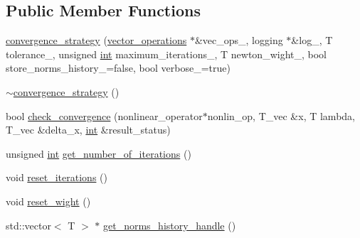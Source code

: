 \subsection*{Public Member Functions}
\begin{DoxyCompactItemize}
\item 
\hyperlink{classnonlinear__operators_1_1newton__method_1_1convergence__strategy_a00e18a10009c673718f85720cfd37f53}{convergence\-\_\-strategy} (\hyperlink{container__test_8cpp_aca3cc0310428d338f3a165c7823d6499}{vector\-\_\-operations} $\ast$\&vec\-\_\-ops\-\_\-, logging $\ast$\&log\-\_\-, T tolerance\-\_\-, unsigned \hyperlink{classint}{int} maximum\-\_\-iterations\-\_\-, T newton\-\_\-wight\-\_\-, bool store\-\_\-norms\-\_\-history\-\_\-=false, bool verbose\-\_\-=true)
\item 
\hyperlink{classnonlinear__operators_1_1newton__method_1_1convergence__strategy_a8c43cb374b68b7edaf5e9570beacde60}{$\sim$convergence\-\_\-strategy} ()
\item 
bool \hyperlink{classnonlinear__operators_1_1newton__method_1_1convergence__strategy_af14415fad7e86ef9c2bf3da72745f685}{check\-\_\-convergence} (nonlinear\-\_\-operator$\ast$nonlin\-\_\-op, T\-\_\-vec \&x, T lambda, T\-\_\-vec \&delta\-\_\-x, \hyperlink{classint}{int} \&result\-\_\-status)
\item 
unsigned \hyperlink{classint}{int} \hyperlink{classnonlinear__operators_1_1newton__method_1_1convergence__strategy_a4ffd50fbf3c7b4d624b217e854e51e3a}{get\-\_\-number\-\_\-of\-\_\-iterations} ()
\item 
void \hyperlink{classnonlinear__operators_1_1newton__method_1_1convergence__strategy_a5c24a88352363a49d2f93b74f41f5ba3}{reset\-\_\-iterations} ()
\item 
void \hyperlink{classnonlinear__operators_1_1newton__method_1_1convergence__strategy_a207705b48cf5c002f33f0bc6e4f2cdf2}{reset\-\_\-wight} ()
\item 
std\-::vector$<$ T $>$ $\ast$ \hyperlink{classnonlinear__operators_1_1newton__method_1_1convergence__strategy_a6e7c6939333bc5e34db93075f90f5944}{get\-\_\-norms\-\_\-history\-\_\-handle} ()
\end{DoxyCompactItemize}


